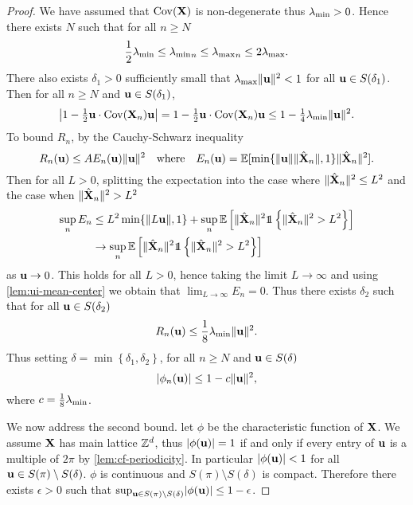 \begin{proof}
    We have assumed that $\cov(\vX)$ is non-degenerate thus $\mineval > 0$. Hence there exists $N$ such that for all $n \geq N$
    \begin{equation*}
        \frac{1}{2} \mineval \leq \mineval_n \leq \maxeval_n \leq 2 \maxeval.
    \end{equation*}
    There also exists $\delta_1 > 0$ sufficiently small that $\maxeval \norm{\vu}^2 < 1$ for all $\vu \in S(\delta_1)$. Then for all $n \geq N$ and $\vu \in S(\delta_1)$,
    \begin{equation}
        \abs*{1 - \tfrac{1}{2} \vu \cdot \cov(\vX_n) \vu }
        = 1 - \tfrac{1}{2} \vu \cdot \cov(\vX_n) \vu
        \leq 1 - \tfrac{1}{4} \mineval \norm{\vu}^2. \label{eq:qf-bound}
    \end{equation}
    To bound $R_n$, by the Cauchy-Schwarz inequality
    \begin{equation*}
        R_n(\vu) \leq A E_n(\vu) \norm{\vu}^2
        \quad \text{where} \quad
        E_n(\vu) = \E[\min\{\norm{\vu} \norm{\centeredX_n}, 1\} \norm{\centeredX_n}^2].
    \end{equation*}
    Then for all $L > 0$, splitting the expectation into the case where $\norm{\centeredX_n}^2 \leq L^2$ and the case when $\norm{\centeredX_n}^2 > L^2$
    \begin{align*}
        \sup_n E_n
        &\leq L^2 \min\{\norm{L\vu}, 1\} +
        \sup_n \E\left[ \norm{\centeredX_n}^2 \one\left\{ \norm{\centeredX_n}^2 > L^2 \right\}
        \right] \\
        &\to \sup_n \E\left[ \norm{\centeredX_n}^2 \one\left\{ \norm{\centeredX_n}^2 > L^2 \right\}
        \right] 
    \end{align*}
    as $\vu \to 0$. This holds for all $L > 0$, hence taking the limit $L \to \infty$ and using \cref{lem:ui-mean-center} we obtain that $\lim_{L \to \infty} E_n = 0$. Thus there exists $\delta_2$ such that for all $\vu \in S(\delta_2)$
    \begin{equation}
        \label{eq:rn-bound}
        R_n(\vu) \leq \frac{1}{8} \mineval \norm{\vu}^2.
    \end{equation}
    Thus setting $\delta = \min\left\{ \delta_1, \delta_2 \right\}$, for all $n \geq N$ and $\vu \in S(\delta)$
    \begin{equation*}
        \abs{\phi_n(\vu)} \leq 1 - c \norm{\vu}^2,
    \end{equation*}
    where $c = \frac{1}{8} \mineval$.

    We now address the second bound. let $\phi$ be the characteristic function of $\vX$. We assume $\vX$ has main lattice $\Z^d$, thus $\abs{\phi(\vu)} = 1$ if and only if every entry of $\vu$ is a multiple of $2 \pi$ by \cref{lem:cf-periodicity}. In particular $\abs{\phi(\vu)} < 1$ for all $\vu \in S(\pi) \setminus S(\delta)$. $\phi$ is continuous and $S(\pi) \setminus S(\delta)$ is compact. Therefore there exists $\epsilon > 0$ such that $\sup_{\vu \in S(\pi) \setminus S(\delta)} \abs{\phi(\vu)} \leq 1 - \epsilon$.


\end{proof}
